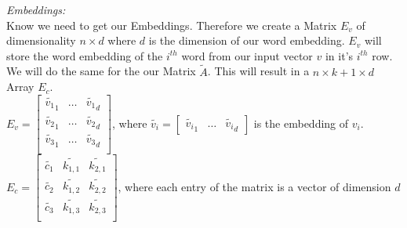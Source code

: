 \textit{Embeddings:}\\
 Know we need to get our Embeddings. Therefore we create a Matrix $E_v$ of dimensionality $n \times d$ where $d$ is the dimension of our word embedding. $E_v$ will store the word embedding of the $i^{th}$ word from our input vector $v$ in it's $i^{th}$ row. We will do the same for the our Matrix $\tilde{A}$. This will result in a $n \times k+1 \times d$ Array $E_c$. \\
 $E_v = \begin{bmatrix}
\tilde{v_1}_1 & \ldots & \tilde{v_1}_d\\
\tilde{v_2}_1 & \ldots & \tilde{v_2}_d\\
\tilde{v_3}_1 & \ldots & \tilde{v_3}_d\\
\end{bmatrix}
$, where $\tilde{v_i} = \begin{bmatrix}
\tilde{v_i}_1 & \ldots & \tilde{v_i}_d \end{bmatrix}$ is the embedding of $v_i$.  \\


$E_c = \begin{bmatrix}
\tilde{c_1 }& \tilde{k_{1,1}} & \tilde{k_{2,1}} \\
\tilde{c_2 }& \tilde{k_{1,2}}& \tilde{k_{2,2}} \\
\tilde{c_3 }&\tilde{ k_{1,3} }& \tilde{k_{2,3}}\\
\end{bmatrix}$,
where each entry of the matrix is a vector of dimension $d$\\

